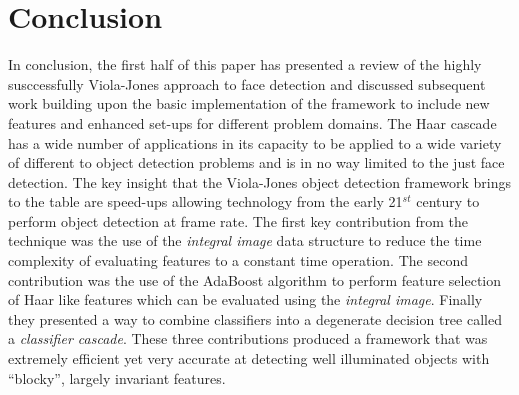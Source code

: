 \documentclass[conference]{IEEEtran}
\begin{document}
%





\section{Conclusion} \label{sec:conclusion}
In conclusion, the first half of this paper has presented a review of the highly susccessfully Viola-Jones approach to face detection and discussed subsequent work building upon the basic implementation of the framework to include new features and enhanced set-ups for different problem domains. The Haar cascade has a wide number of applications in its capacity to be applied to a wide variety of different to object detection problems and is in no way limited to the just face detection. The key insight that the Viola-Jones object detection framework brings to the table are speed-ups allowing technology from the early 21$^{st}$ century to perform object detection at frame rate. The first key contribution from the technique was the use of the \textit{integral image} data structure to reduce the time complexity of evaluating features to a constant time operation. The second contribution was the use of the AdaBoost algorithm to perform feature selection of Haar like features which can be evaluated using the \textit{integral image}. Finally they presented a way to combine classifiers into a degenerate decision tree called a \textit{classifier cascade}. These three contributions produced a framework that was extremely efficient yet very accurate at detecting well illuminated objects with ``blocky'', largely invariant features.
\end{document}
